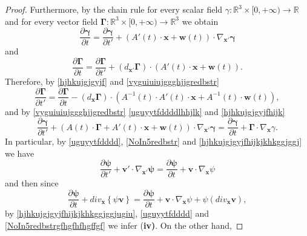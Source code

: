 \documentclass{article}
\theoremstyle{definition}
\theoremstyle{remark}
\renewcommand{\vec}[1]{\mathbf{#1}}
\newcommand{\R}{\mathbb{R}}
\newcommand{\er}{\eqref}
\newcommand{\R}{{\mathbb{R}}}
\newcommand{\er}{\eqref}
\begin{document}
\begin{proof}
Furthermore, by the chain rule for every scalar field
$\gamma:\R^3\times[0,+\infty)\to\R$ and for every vector field $\vec
\Gamma:\R^3\times[0,+\infty)\to\R^3$ we obtain
\begin{equation}\label{hjhkujgjgyjfhijk}
\frac{\partial \vec \gamma}{\partial t}=\frac{\partial \vec
\gamma}{\partial t'}+\left(A'(t)\cdot\vec x+\vec
w(t)\right)\cdot\nabla_{\vec x'}\vec \gamma
\end{equation}
and
\begin{equation}\label{hjhkujgjgyjf}
\frac{\partial \vec \Gamma}{\partial t}=\frac{\partial \vec
\Gamma}{\partial t'}+\left(d_{\vec x'}\vec
\Gamma\right)\cdot\left(A'(t)\cdot\vec x+\vec w(t)\right).
\end{equation}
Therefore, by \er{hjhkujgjgyjf} and \er{vyguiuiujggghjjgredbstr}
\begin{equation}
\label{vyguiuiujggghjjgggjredbstr} \frac{\partial \vec
\Gamma}{\partial t'}=\frac{\partial \vec \Gamma}{\partial
t}-\left(d_{\vec x}\vec \Gamma\right)\cdot \left(A^{-1}(t)\cdot
A'(t)\cdot\vec x+A^{-1}(t)\cdot \vec w(t)\right),
\end{equation}
and by \er{vyguiuiujggghjjgredbstr} \er{uguyytfddddlhhjlk} and
\er{hjhkujgjgyjfhijk}
\begin{equation}\label{hjhkujgjgyjfhijkjkhkggjggj}
\frac{\partial \vec \gamma}{\partial t'}+\left(A(t)\cdot\vec
\Gamma+A'(t)\cdot\vec x+\vec w(t)\right)\cdot\nabla_{\vec x'}\vec
\gamma=\frac{\partial \vec \gamma}{\partial
t}+\vec\Gamma\cdot\nabla_{\vec x}\gamma.
\end{equation}
In particular, by \er{uguyytfdddd}, \er{NoIn5redbstr} and
\er{hjhkujgjgyjfhijkjkhkggjggj} we have
\begin{equation}\label{hjhkujgjgyjfhijkjkhkggjggjugiu}
\frac{\partial \vec \psi}{\partial t'}+\vec v'\cdot\nabla_{\vec
x'}\vec \psi=\frac{\partial \vec \psi}{\partial t}+\vec
v\cdot\nabla_{\vec x}\psi
\end{equation}
and then since
\begin{equation}\label{hjhkujgjgyjfhijkjkhkggjggjugiujghj}
\frac{\partial \vec \psi}{\partial t}+div_{\vec x}\left\{\psi\vec
v\right\}=\frac{\partial \vec \psi}{\partial t}+\vec
v\cdot\nabla_{\vec x}\psi+\psi\left(div_{\vec x}\vec v\right),
\end{equation}
by \er{hjhkujgjgyjfhijkjkhkggjggjugiu}, \er{uguyytfdddd} and
\er{NoIn5redbstrgfhgfhfhgffgf} we infer {(\bf iv)}. On the other
hand,
%
%
%
\begin{comment}

\end{comment}
\end{proof}
\end{document}
